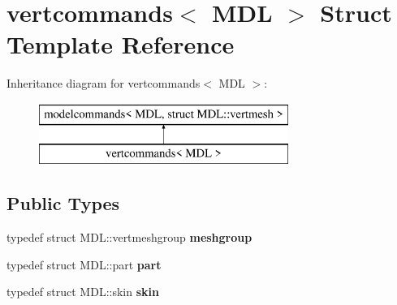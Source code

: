 \hypertarget{structvertcommands}{}\section{vertcommands$<$ M\+DL $>$ Struct Template Reference}
\label{structvertcommands}
Inheritance diagram for vertcommands$<$ M\+DL $>$\+:\begin{figure}[H]
\begin{center}
\leavevmode
\includegraphics[height=2.000000cm]{structvertcommands}
\end{center}
\end{figure}
\subsection*{Public Types}
\begin{DoxyCompactItemize}
\item 
\mbox{\label{structvertcommands_a04343ea440519ef07ea6f8f115c90960}} 
typedef struct M\+D\+L\+::vertmeshgroup {\bfseries meshgroup}
\item 
\mbox{\label{structvertcommands_a119f6f4d058130e271d4a4aa32764efc}} 
typedef struct M\+D\+L\+::part {\bfseries part}
\item 
\mbox{\label{structvertcommands_ad92c567daa3ee0a56ec4462142ae3654}} 
typedef struct M\+D\+L\+::skin {\bfseries skin}
\end{DoxyCompactItemize}
